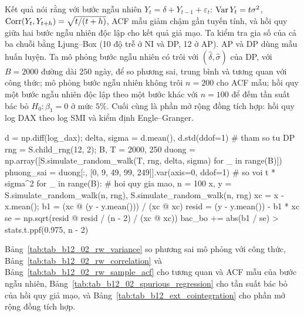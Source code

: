  Kết quả  nói rằng với bước ngẫu nhiên $Y_t=\delta+Y_{t-1}+\varepsilon_t$: $\operatorname{Var} Y_t=t\sigma^2$, $\operatorname{Corr}(Y_t,Y_{t+h})=\sqrt{t/(t+h)}$, ACF mẫu giảm chậm gần tuyến tính, và hồi quy giữa hai bước ngẫu nhiên độc lập cho kết quả giả mạo.
 Ta kiểm tra gia số của cả ba chuỗi bằng Ljung--Box (10 độ trễ ở NI và DP, 12 ở AP). AP và DP dùng mẫu huấn luyện. Ta mô phỏng bước ngẫu nhiên có trôi với $(\hat\delta,\hat\sigma)$ của DP, với $B=2000$ đường dài $250$ ngày, để so phương sai, trung bình và tương quan với công thức; mô phỏng bước ngẫu nhiên không trôi $n=200$ cho ACF mẫu; hồi quy một bước ngẫu nhiên độc lập theo một bước khác với $n=100$ để đếm tần suất bác bỏ $H_0:\beta_1=0$ ở mức $5\%$. Cuối cùng là phần mở rộng đồng tích hợp: hồi quy log DAX theo log SMI và kiểm định Engle--Granger.
\begin{codeblock}
d = np.diff(log_dax); delta, sigma = d.mean(), d.std(ddof=1)      # tham so tu DP
rng = S.child_rng(12, 2); B, T = 2000, 250
duong = np.array([S.simulate_random_walk(T, rng, delta, sigma) for _ in range(B)])
phuong_sai = duong[:, [0, 9, 49, 99, 249]].var(axis=0, ddof=1)    # so voi t * sigma^2
for _ in range(B):                                    # hoi quy gia mao, n = 100
    x, y = S.simulate_random_walk(n, rng), S.simulate_random_walk(n, rng)
    xc = x - x.mean(); b1 = (xc @ (y - y.mean())) / (xc @ xc)
    resid = (y - y.mean()) - b1 * xc
    se = np.sqrt(resid @ resid / (n - 2) / (xc @ xc))
    bac_bo += abs(b1 / se) > stats.t.ppf(0.975, n - 2)
\end{codeblock}
 Bảng~\ref{tab:tab_b12_02_rw_variance} so phương sai mô phỏng với công thức, Bảng~\ref{tab:tab_b12_02_rw_correlation} và Bảng~\ref{tab:tab_b12_02_rw_sample_acf} cho tương quan và ACF mẫu của bước ngẫu nhiên, Bảng~\ref{tab:tab_b12_02_spurious_regression} cho tần suất bác bỏ của hồi quy giả mạo, và Bảng~\ref{tab:tab_b12_ext_cointegration} cho phần mở rộng đồng tích hợp.
